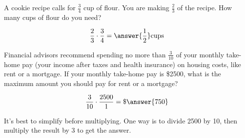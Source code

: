 \documentclass{ximera}[font=12pt]
\begin{document}
\begin{problem}
A cookie recipe calls for $\frac{3}{4}$ cup of flour.  You are making $\frac{2}{3}$ of the recipe.  How many cups of flour do you need?

\[ \frac{2}{3} \cdot \frac{3}{4} = \answer{\frac{1}{2}} \text{cups} \]
\end{problem}


\begin{problem}
Financial advisors recommend spending no more than $\textstyle \frac{3}{10}$ of your monthly take-home pay 
(your income after taxes and health insurance) on housing costs, like rent or a mortgage.  If your monthly 
take-home pay is \$2500, what is the maximum amount you should pay for rent or a mortgage?

\[ \frac{3}{10} \cdot \frac{2500}{1} = \$ \answer{750} \]

\begin{hint}
It's best to simplify before multiplying.  One way is to divide 2500 by 10, then multiply the result by 3 to get the answer.
\end{hint}

\end{problem}
\end{document}
